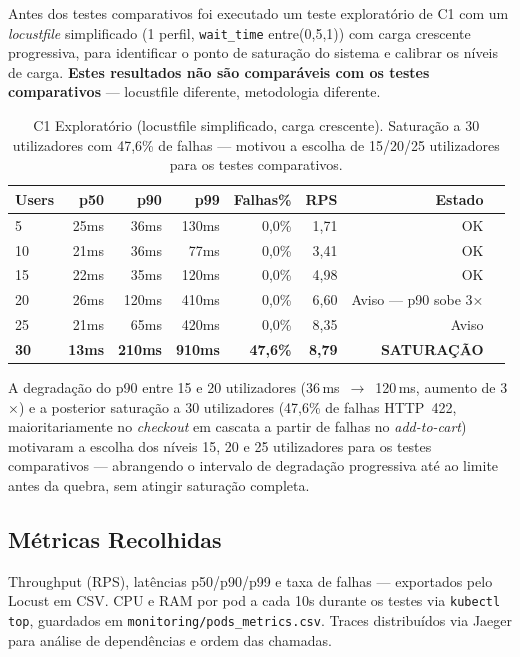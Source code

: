 \documentclass[acmsmall,screen=true,nonacm]{acmart}
\begin{document}
Antes dos testes comparativos foi executado um teste exploratório de C1 com um \textit{locustfile} simplificado (1 perfil, \texttt{wait\_time} entre(0{,}5,1)) com carga crescente progressiva, para identificar o ponto de saturação do sistema e calibrar os níveis de carga. \textbf{Estes resultados não são comparáveis com os testes comparativos} — locustfile diferente, metodologia diferente.

\begin{table}[h]
\caption{C1 Exploratório (locustfile simplificado, carga crescente). Saturação a 30 utilizadores com 47{,}6\% de falhas — motivou a escolha de 15/20/25 utilizadores para os testes comparativos.}
\label{tab:c1exp}
\begin{tabular}{lrrrrrrl}
\toprule
\textbf{Users} & \textbf{p50} & \textbf{p90} & \textbf{p99} & \textbf{Falhas\%} & \textbf{RPS} & \textbf{Estado} \\
\midrule
5  & 25ms & 36ms  & 130ms & 0{,}0\% & 1{,}71 & OK \\
10 & 21ms & 36ms  & 77ms  & 0{,}0\% & 3{,}41 & OK \\
15 & 22ms & 35ms  & 120ms & 0{,}0\% & 4{,}98 & OK \\
20 & 26ms & 120ms & 410ms & 0{,}0\% & 6{,}60 & Aviso — p90 sobe 3× \\
25 & 21ms & 65ms  & 420ms & 0{,}0\% & 8{,}35 & Aviso \\
\textbf{30} & \textbf{13ms} & \textbf{210ms} & \textbf{910ms} & \textbf{47{,}6\%} & \textbf{8{,}79} & \textbf{SATURAÇÃO} \\
\bottomrule
\end{tabular}
\end{table}

A degradação do p90 entre 15 e 20 utilizadores (36\,ms~$\rightarrow$~120\,ms, aumento de 3$\times$) e a posterior saturação a 30 utilizadores (47{,}6\% de falhas HTTP~422, maioritariamente no \textit{checkout} em cascata a partir de falhas no \textit{add-to-cart}) motivaram a escolha dos níveis 15, 20 e 25 utilizadores para os testes comparativos — abrangendo o intervalo de degradação progressiva até ao limite antes da quebra, sem atingir saturação completa.

\subsection{Métricas Recolhidas}

Throughput (RPS), latências p50/p90/p99 e taxa de falhas — exportados pelo Locust em CSV. CPU e RAM por pod a cada 10s durante os testes via \texttt{kubectl top}, guardados em \texttt{monitoring/pods\_metrics.csv}. Traces distribuídos via Jaeger para análise de dependências e ordem das chamadas.
\end{document}
